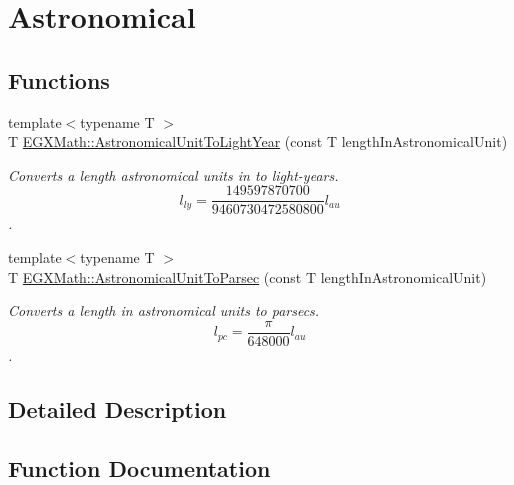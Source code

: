 \hypertarget{group___e_g_x_math-_conversions-_length_conversions-_astronomical-_astronomical_unit-_astronomical}{}\section{Astronomical}
\label{group___e_g_x_math-_conversions-_length_conversions-_astronomical-_astronomical_unit-_astronomical}
\subsection*{Functions}
\begin{DoxyCompactItemize}
\item 
{\footnotesize template$<$typename T $>$ }\\T \mbox{\hyperlink{group___e_g_x_math-_conversions-_length_conversions-_astronomical-_astronomical_unit-_astronomical_ga3ef6f77258333914d94d01c4a963ad2e}{E\+G\+X\+Math\+::\+Astronomical\+Unit\+To\+Light\+Year}} (const T length\+In\+Astronomical\+Unit)
\begin{DoxyCompactList}\small\item\em Converts a length astronomical units in to light-\/years. \[ l_{ly}= \frac{149597870700}{9460730472580800} l_{au} \]. \end{DoxyCompactList}\item 
{\footnotesize template$<$typename T $>$ }\\T \mbox{\hyperlink{group___e_g_x_math-_conversions-_length_conversions-_astronomical-_astronomical_unit-_astronomical_gabcd5dd0effb649f31e9e4e3091679cdd}{E\+G\+X\+Math\+::\+Astronomical\+Unit\+To\+Parsec}} (const T length\+In\+Astronomical\+Unit)
\begin{DoxyCompactList}\small\item\em Converts a length in astronomical units to parsecs. \[ l_{pc}=\frac{\pi}{648000} l_{au} \]. \end{DoxyCompactList}\end{DoxyCompactItemize}


\subsection{Detailed Description}


\subsection{Function Documentation}
\mbox{\label{group___e_g_x_math-_conversions-_length_conversions-_astronomical-_astronomical_unit-_astronomical_ga3ef6f77258333914d94d01c4a963ad2e}} 
